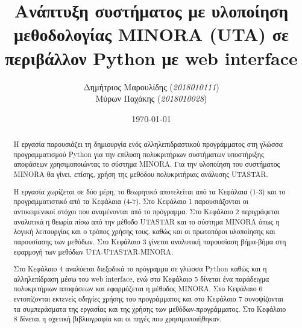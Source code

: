 \documentclass[12pt,a4paper,titlepage]{article}
\author{Δημήτριος Μαρουλίδης (\textit{2018010111}) \\
    Μύρων Παχάκης (\textit{2018010028})}
\title{Ανάπτυξη συστήματος με υλοποίηση μεθοδολογίας MINORA (UTA) σε περιβάλλον Python με web interface}
\date{\today}
\numberwithin{equation}{section}
\begin{document}
\maketitle	
\tableofcontents

\clearpage

\begin{comment}
Πλάνο Σύνταξης Αναφοράς
Εισαγωγή
1.Αντικειμενικοί Στόχοι Εργασίας-Προγράμματος
2.Περιγραφή μεθόδου θεωρητικά (Λογική της μεθόδου, ποιός την έφτιαξε)
3.Αναλύτικη Περιγραφή Μεθόδου (Χρησιμοποιούμε αυτό, κάνουμε αυτό, παρουσίαση αποτελέσματος, δεν σταματάμε όμως εκεί έχουμε ανατροφοδότηση από τον χρήστη (web interface), κάνει αυτή τη διαδικασία ο χρήστης)
4.Περιγραφή Υλοποίησης
5.Αναλυτικό Παράδειγμα εφαρμογής της μεθόδου
6.Παράρτημα -> Οδηγίες Χρήσης του προγράμματος-μεθόδου
7.Συμπεράσματα
8.Βιβλιογραφία
\end{comment}

\begin{abstract}
Η εργασία παρουσιάζει τη δημιουργία ενός αλληλεπιδραστικού προγράμματος στη γλώσσα προγραμματισμού Python για την επίλυση πολυκριτήριων συστήματων υποστήριξης αποφάσεων χρησιμοποιώντας το σύστημα MINORA. Για την υλοποίηση του συστήματος MINORA θα γίνει, επίσης, χρήση της μεθόδου πολυκριτήριας ανάλυσης UTASTAR. 

Η εργασία χωρίζεται σε δύο μέρη, το θεωρητικό αποτελείται από τα Κεφάλαια (1-3) και το προγραμματιστικό από τα Κεφάλαια (4-7). Στο Κεφάλαιο 1 παρουσιάζονται οι αντικειμενικοί στόχοι που αναμένονται από το πρόγραμμα. Στο Κεφάλαιο 2 περιγράφεται αναλυτικά η θεωρία πίσω από την μέθοδο UTASTAR και το σύστημα MINORA όπως η λογική λειτουργίας και ο τρόπος χρήσης τους, καθώς και οι πρωτοπόροι υλοποίησης και παρουσίασης των μεθόδων. Στο Κεφάλαιο 3 γίνεται αναλυτική παρουσίαση βήμα-βήμα στη εφαρμογή των μεθόδων UTA-UTASTAR-MINORA.

Στο Κεφάλαιο 4 αναλύεται διεξοδικά το πρόγραμμα σε γλώσσα Python καθώς και η αλληλεπίδραση μέσω του web interface, ενώ στο Κεφάλαιο 5 δίνεται ένα παράδειγμα πολυκριτήριων αποφάσεων και εφαρμόζεται η μέθοδος MINORA. Στο Κεφάλαιο 6 εντοπίζονται εκτενείς οδηγίες χρήσης του προγράμματος και στο Κεφάλαιο 7 συνοψίζονται τα συμπεράσματα της εργασίας και της χρήσης των μεθόδων-προγράμματος. Στο Κεφάλαιο 8 δίνεται η σχετική βιβλιογραφία και οι πηγές που χρησιμοποιήθηκαν.
\end{abstract}


\end{document}
